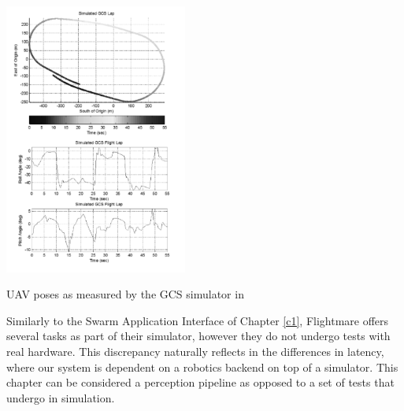 

\begin{marginfigure}%
    \includegraphics[width=6cm]{images/xr_discussion/gcs_simulation_bw.png}
    \caption{UAV poses as measured by the GCS simulator in \cite{gcs_validation}}
    \label{fig:UAV_simulator}
\end{marginfigure}



Similarly to the Swarm Application Interface of Chapter \ref{c1}, Flightmare offers several tasks as part of their simulator, however they do not undergo tests with real hardware. This discrepancy naturally reflects in the differences in latency, where our system is dependent on a robotics backend on top of a simulator. This chapter can be considered a perception pipeline as opposed to a set of tests that undergo in simulation.


